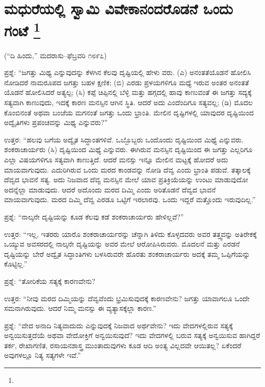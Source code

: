 
\chapter[ಮಧುರೆಯಲ್ಲಿ ಸ್ವಾಮಿ ವಿವೇಕಾನಂದರೊಡನೆ ಒಂದು ಗಂಟೆ ]{ಮಧುರೆಯಲ್ಲಿ ಸ್ವಾಮಿ ವಿವೇಕಾನಂದರೊಡನೆ ಒಂದು ಗಂಟೆ \protect\footnote{}}

\centerline{(“ದಿ ಹಿಂದು,” ಮದರಾಸು–ಫೆಬ್ರವರಿ ೧೮೯೭)}

ಪ್ರಶ್ನೆ: “ಜಗತ್ತು ಮಿಥ್ಯ ಎನ್ನುವುದನ್ನು ಕೆಳಗಿನ ಕೆಲವು ದೃಷ್ಟಿಯಲ್ಲಿ ಹೇಳು ವರು. (ಎ) ಅನಂತತೆಯೊಡನೆ ಹೋಲಿಸಿ ನೋಡಿದರೆ ನಾಮರೂಪದ ಜಗತ್ತು ಬಹಳ ಕ್ಷಣಿಕ; (ಬಿ) ಎರಡು ಪ್ರಳಯಗಳಿಗೂ ಮಧ್ಯೆ ಇರುವ ಅಂತರ ಅನಂತತೆ ಯೊಡನೆ ಹೋಲಿಸಿದರೆ ಅತ್ಯಲ್ಪ; (ಸಿ) ಕಪ್ಪೆ ಚಿಪ್ಪಿನಲ್ಲಿ ಬೆಳ್ಳಿ ಮತ್ತು ಹಗ್ಗದಲ್ಲಿ ಹಾವು ಕಾಣುವಂತೆ ಈ ಜಗತ್ತು ಸದ್ಯಕ್ಕೆ ಸತ್ಯವಾಗಿ ಕಾಣುವುದು, ಇದಕ್ಕೆ ಕಾರಣ ಮನಸ್ಸಿನ ಆಗಿನ ಸ್ಥಿತಿ. ಆದರೆ ಅದು ಎಂದೆಂದಿಗೂ ಸತ್ಯವಲ್ಲ; (ಡಿ) ಮೊದಲ ಕೊಂಬಿನಂತೆ ಅಥವಾ ಬಂಜೆಯ ಮಗನಂತೆ ಜಗತ್ತು ಒಂದು ಭ್ರಾಂತಿ. ಮೇಲಿನ ದೃಷ್ಟಿಗಳಲ್ಲಿ ಯಾವುದರ ದೃಷ್ಟಿಯಿಂದ ಅದ್ವೈತಿಗಳು ಪ್ರಪಂಚವನ್ನು ಮಿಥ್ಯ ಎನ್ನುವರು?”

ಉತ್ತರ: “ಹಲವು ಬಗೆಯ ಅದ್ವೈತ ಸಿದ್ಧಾಂತಗಳಿವೆ. ಒಬ್ಬೊಬ್ಬರು ಒಂದೊಂದು ದೃಷ್ಟಿಯಿಂದ ಮಿಥ್ಯೆ ಎನ್ನುವರು. ಶಂಕರಾಚಾರ್ಯರು (ಸಿ) ದೃಷ್ಟಿಯಿಂದ ಮಿಥ್ಯೆ ಎನ್ನುವರು. ಈಗಿರುವ ಮನಸ್ಸಿನ ದೃಷ್ಟಿಯಿಂದ ಈ ಜಗತ್ತು ಎಲ್ಲರಿಗೂ ಎಲ್ಲಾ ವಿಷಯಗಳಿಗೂ ಸತ್ಯವಾಗಿ ಕಾಣುತ್ತಿದೆ. ಆದರೆ ಮನಸ್ಸು ಇನ್ನೂ ಮೇಲಿನ ಮಟ್ಟಕ್ಕೆ ಹೋದರೆ ಅದು ಮಾಯವಾಗುವುದು. ಎದುರಿಗಿರುವ ಒಂದು ಮರದ ಕಾಂಡವನ್ನು ನೋಡಿ ದೆವ್ವ ಎಂದು ಭ್ರಾಂತಿ ಪಡುವೆ. ತತ್ಕಾಲಕ್ಕೆ ದೆವ್ವದ ಭಾವನೆ ಸತ್ಯ. ಅದು ನಿಜವಾದ ದೆವ್ವ ಮನಸ್ಸಿನ ಮೇಲೆ ಯಾವ ಪ್ರತಿಕ್ರಿಯೆಯನ್ನು ಉಂಟು ಮಾಡುವುದೋ ಅದನ್ನೆಲ್ಲಾ ಮಾಡುವುದು. ಆದರೆ ಅದೊಂದು ಮರದ ದಿಮ್ಮಿ ಎಂದು ಅರಿತೊಡನೆ ದೆವ್ವದ ಭಾವನೆ ಮಾಯವಾಗುವುದು. ಮರದ ದಿಮ್ಮಿ ದೆವ್ವ ಎರಡೂ ಒಟ್ಟಿಗೆ ಇರಲಾರವು. ಒಂದು ಇದ್ದರೆ ಮತ್ತೊಂದು ಇರುವುದಿಲ್ಲ.”

ಪ್ರಶ್ನೆ: “ನಾಲ್ಕನೇ ದೃಷ್ಟಿಯನ್ನು ಕೂಡ ಕೆಲವು ಕಡೆ ಶಂಕರಾಚಾರ್ಯರು ಹೇಳಿಲ್ಲವೆ?”

ಉತ್ತರ: “ಇಲ್ಲ, ಇತರರು ಯಾರೊ ಶಂಕರಾಚಾರ್ಯರನ್ನು ಚೆನ್ನಾಗಿ ತಿಳಿದು ಕೊಳ್ಳದವರು ಅವರ ತತ್ತ್ವವನ್ನು ಅತಿರೇಕಕ್ಕೆ ಒಯ್ಯುವ ಅವಸರದಲ್ಲಿ ನಾಲ್ಕನೇ ದೃಷ್ಟಿಯನ್ನು ಅವರ ಮೇಲೆ ಆರೋಪಿಸಿರುವರು. ಮೊದಲನೆ ಮತ್ತು ಎರಡನೆ ದೃಷ್ಟಿಯನ್ನು ಬೇರೆ ಅದ್ವೈತ ಸಿದ್ಧಾಂತಿಗಳು ಬಳಸಿರುವರೇ ಹೊರತು ಶಂಕರಾಚಾರ್ಯರು ಅದಕ್ಕೆ ತಮ್ಮ ಒಪ್ಪಿಗೆಯನ್ನು ಕೊಟ್ಟಿಲ್ಲ.”

ಪ್ರಶ್ನೆ: “ತೋರಿಕೆಯ ಸತ್ಯಕ್ಕೆ ಕಾರಣವೇನು?

ಉತ್ತರ: “ನೀವು ಮರದ ದಿಮ್ಮಿಯನ್ನು ದೆವ್ವವೆಂದು ಭ್ರಮಿಸುವುದಕ್ಕೆ ಕಾರಣವೇನು? ಜಗತ್ತು ಯಾವಾಗಲೂ ಒಂದೇ ಸಮನಾಗಿರುವುದು. ಆದರೆ ನಿಮ್ಮ ಮನಸ್ಸು ಈ ವ್ಯತ್ಯಾಸಕ್ಕೆಲ್ಲಾ ಕಾರಣ.”

ಪ್ರಶ್ನೆ: “ವೇದ ಅನಾದಿ ನಿತ್ಯವಾದುದು ಎನ್ನುವುದಕ್ಕೆ ನಿಜವಾದ ಅರ್ಥವೇನು? ಇದು ವೇದಗಳಲ್ಲಿರುವ ಸತ್ಯಕ್ಕೆ ಅನ್ವಯಿಸುತ್ತದೆಯೆ ಅಥವಾ ವೇದೋಕ್ತಿಗೆ ಅನ್ವಯಿಸುವುದೆ? ಇದು ವೇದಗಳಲ್ಲಿ ಬರುವ ಸತ್ಯಕ್ಕೆ ಅನ್ವಯಿಸುವ ಹಾಗಿದ್ದರೆ ತರ್ಕ, ರೇಖಾಗಣಿತ, ರಸಾಯನಶಾಸ್ತ್ರ ಮುಂತಾದುವುಗಳು ಕೂಡ ಆದಿ ಅಂತ್ಯ ವಿಲ್ಲದವೇ ಆಯಿತಲ್ಲ? ಏಕೆಂದರೆ ಅವುಗಳಲ್ಲೂ ನಿತ್ಯ ಸತ್ಯಗಳೇ ಇವೆ.”

